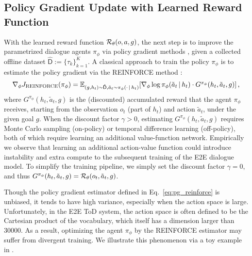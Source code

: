 \subsection{Policy Gradient Update with Learned Reward Function}\label{sec:main_gs}
\vspace{-.4em}
With the learned reward function ${\mathcal{R}}_{\theta}(o, a, g)$, the next step is to improve the parametrized dialogue agents $\pi_{\phi}$ via policy gradient methods \citep{rlintro2018}, given a collected offline dataset $\hat{\mathsf{D}} := \{\tau_{k}\}_{k=1}^{K}$.
A classical approach to train the policy $\pi_{\phi}$ is to estimate the policy gradient via the REINFORCE method \citep{reinforce1992}:
\begin{align}\textstyle
\nabla_{\phi}J_{\small{\mathrm{REINFORCE}}}(\pi_{\phi}) = \E_{ (g, h_t) \sim \hat{\mathsf{D}}, \tilde{a}_{t} \sim \pi_\phi(\cdot \given h_t)}[\nabla_{\phi}\log \pi_{\phi}(\tilde{a}_{t} \given h_t)\cdot G^{\pi_{\phi}}(h_t , \tilde{a}_{t},g)]\,, \label{eq:pg_reinforce}
\end{align}
where $G^{\pi_{\phi}}(h_t , \tilde{a}_{t},g)$ is the (discounted) accumulated reward that the agent  $\pi_{\phi}$ receives, starting from the observation $o_t$ (part of $h_t$) and action $\tilde{a}_{t}$, under the given goal $g$. 
When the discount factor $\gamma > 0$, estimating $G^{\pi_{\phi}}(h_t, \tilde{a}_{t},g)$ requires Monte Carlo sampling (on-policy) or temporal difference learning (off-policy), both of which require learning an additional value-function network.
Empirically we observe that learning an additional action-value function could introduce  instability and extra compute to the subsequent training of the E2E dialogue model.
To simplify the training pipeline, we simply set the discount factor $\gamma = 0$, and thus $G^{\pi_{\phi}}(h_t, \tilde{a}_{t},g) = {\mathcal{R}}_{\theta}(o_t, \tilde{a}_t, g)$. 

Though the policy gradient estimator defined in Eq.~\eqref{eq:pg_reinforce} is unbiased, 
it tends to have high variance, especially when the action space is large.
Unfortunately, in the E2E ToD system, the action space is often defined to be the Cartesian product of the vocabulary, which itself has a dimension larger than $30000$.
As a result, optimizing the agent $\pi_{\phi}$ by the REINFORCE estimator may suffer from divergent training.
We illustrate this phenomenon via a toy example in .

